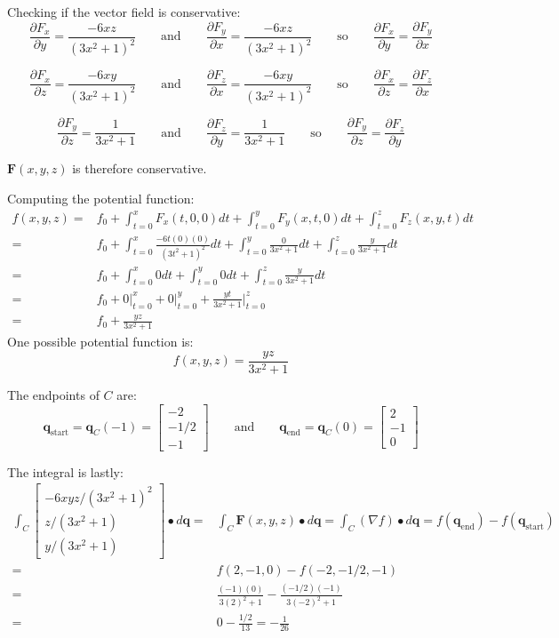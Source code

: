 \documentclass{article}
\begin{document}
\begin{itemize}
Checking if the vector field is conservative:
\[\frac{\partial F_x}{\partial y} = \frac{-6xz}{(3x^2 + 1)^2} \quad\quad\text{and}\quad\quad \frac{\partial F_y}{\partial x} = \frac{-6xz}{(3x^2 + 1)^2} \quad\quad\text{so}\quad\quad \frac{\partial F_x}{\partial y} = \frac{\partial F_y}{\partial x}\]

\[\frac{\partial F_x}{\partial z} = \frac{-6xy}{(3x^2 + 1)^2} \quad\quad\text{and}\quad\quad \frac{\partial F_z}{\partial x} = \frac{-6xy}{(3x^2 + 1)^2} \quad\quad\text{so}\quad\quad \frac{\partial F_x}{\partial z} = \frac{\partial F_z}{\partial x}\]

\[\frac{\partial F_y}{\partial z} = \frac{1}{3x^2 + 1} \quad\quad\text{and}\quad\quad \frac{\partial F_z}{\partial y} = \frac{1}{3x^2 + 1} \quad\quad\text{so}\quad\quad \frac{\partial F_y}{\partial z} = \frac{\partial F_z}{\partial y}\]

\(\mathbf{F}(x,y,z)\) is therefore conservative. 

Computing the potential function:
\begin{align*}
f(x,y,z) = & f_0 + \int_{t = 0}^x F_x(t,0,0)dt + \int_{t=0}^y F_y(x,t,0)dt + \int_{t=0}^z F_z(x,y,t)dt \\  
= & f_0 + \int_{t = 0}^x \frac{-6t(0)(0)}{(3t^2 + 1)^2}dt + \int_{t = 0}^y \frac{0}{3x^2 + 1}dt + \int_{t = 0}^z \frac{y}{3x^2 + 1}dt \\ 
= & f_0 + \int_{t = 0}^x 0dt + \int_{t = 0}^y 0dt + \int_{t = 0}^z \frac{y}{3x^2 + 1}dt \\
= & f_0 + 0\Big|_{t = 0}^x + 0 \Big|_{t = 0}^y + \frac{yt}{3x^2 + 1}\Big|_{t = 0}^z \\
= & f_0 + \frac{yz}{3x^2 + 1}
\end{align*}
One possible potential function is: 
\[f(x,y,z) = \frac{yz}{3x^2 + 1}\]

The endpoints of \(C\) are: 
\[\mathbf{q}_{\text{start}} = \mathbf{q}_C(-1) = \begin{bmatrix} -2 \\ -1/2 \\ -1 \end{bmatrix}
\quad\quad\text{and}\quad\quad 
\mathbf{q}_{\text{end}} = \mathbf{q}_C(0) = \begin{bmatrix} 2 \\ -1 \\ 0 \end{bmatrix}\]

The integral is lastly:
\begin{align*}
\int_C \begin{bmatrix}
-6xyz/(3x^2 + 1)^2 \\ 
z/(3x^2 + 1) \\ 
y/(3x^2 + 1)
\end{bmatrix} \bullet d\mathbf{q} = & \int_C \mathbf{F}(x,y,z) \bullet d\mathbf{q} 
= \int_C (\nabla f) \bullet d\mathbf{q} 
= f(\mathbf{q}_{\text{end}}) - f(\mathbf{q}_{\text{start}}) \\  
= & f(2, -1, 0) - f(-2, -1/2, -1) \\ 
= & \frac{(-1)(0)}{3(2)^2 + 1} - \frac{(-1/2)(-1)}{3(-2)^2 + 1} \\ 
= & 0 - \frac{1/2}{13}  
= -\frac{1}{26} 
\end{align*}


\end{itemize}
\end{document}
